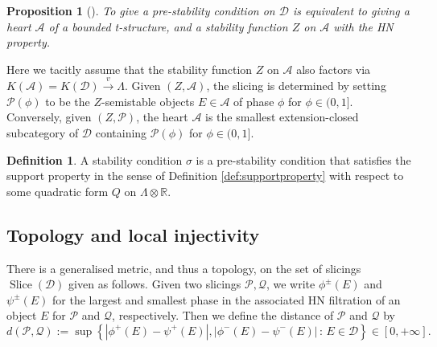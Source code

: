 \documentclass[leqno,11pt,twoside]{amsart}
\newtheorem{Prop}[Thm]{Proposition}
\theoremstyle{definition}
\newtheorem{Def}[Thm]{Definition}
\begin{document}
\begin{Prop}[{\cite[Proposition 5.3]{Bridgeland:Stab}}] \label{prop:stabviaheart}
To give a pre-stability condition on ${\ensuremath{\mathcal D}}$ is equivalent to giving a heart ${\ensuremath{\mathcal A}}$ of a bounded
t-structure, and a stability function $Z$ on ${\ensuremath{\mathcal A}}$ with the HN property.
\end{Prop}
Here we tacitly assume that the stability function $Z$ on ${\ensuremath{\mathcal A}}$ also factors via
$K({\ensuremath{\mathcal A}}) = K({\ensuremath{\mathcal D}}) \xrightarrow{v} \Lambda$. Given $(Z, {\ensuremath{\mathcal A}})$, the slicing is determined by
setting ${\ensuremath{\mathcal P}}(\phi)$ to be the $Z$-semistable objects $E \in {\ensuremath{\mathcal A}}$ of phase $\phi$ for $\phi \in (0,
1]$. Conversely,
given  $(Z, {\ensuremath{\mathcal P}})$, the heart ${\ensuremath{\mathcal A}}$ is the smallest extension-closed subcategory of ${\ensuremath{\mathcal D}}$ containing
${\ensuremath{\mathcal P}}(\phi)$ for $\phi \in (0, 1]$.

\begin{Def} A stability condition $\sigma$ is a pre-stability condition that satisfies the support
property in the sense of Definition \ref{def:supportproperty} with respect to some quadratic
form $Q$ on $\Lambda \otimes {\ensuremath{\mathbb{R}}}$.
\end{Def}

\subsection*{Topology and local injectivity} 
There is a generalised metric, and thus a topology, on the set of slicings ${\mathop{\mathrm{Slice}}\nolimits}({\ensuremath{\mathcal D}})$ given as follows. Given two slicings ${\ensuremath{\mathcal P}}, {\ensuremath{\mathcal Q}}$, we write
$\phi^{\pm}(E)$ and $\psi^{\pm}(E)$ for the largest and smallest phase in the associated HN
filtration of an object $E$ for ${\ensuremath{\mathcal P}}$ and ${\ensuremath{\mathcal Q}}$, respectively. Then we define the distance of ${\ensuremath{\mathcal P}}$ and ${\ensuremath{\mathcal Q}}$ by
\[
d({\ensuremath{\mathcal P}}, {\ensuremath{\mathcal Q}}) := \sup {\left\{{ {\left\lvert{\phi^+(E) - \psi^+(E)}\right\rvert}, {\left\lvert{\phi^-(E) - \psi^-(E)}\right\rvert}}\,\colon\,{E \in {\ensuremath{\mathcal D}}}\right\}} \in [0, +\infty].
\]
\end{document}
